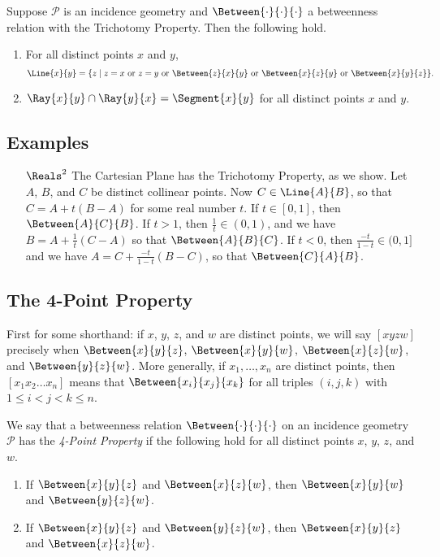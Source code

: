 \documentclass{article}
\begin{document}
\begin{prop}
Suppose $\mathcal{P}$ is an incidence geometry and $\Between{\cdot}{\cdot}{\cdot}$ a betweenness relation with the Trichotomy Property. Then the following hold.
\begin{enumerate}
\item For all distinct points $x$ and $y$, \[ \Line{x}{y} = \{ z \mid z = x\ \mathrm{or}\ z = y\ \mathrm{or}\ \Between{z}{x}{y}\ \mathrm{or}\ \Between{x}{z}{y}\ \mathrm{or}\ \Between{x}{y}{z} \}. \]
\item $\Ray{x}{y} \cap \Ray{y}{x} = \Segment{x}{y}$ for all distinct points $x$ and $y$.
\end{enumerate}
\end{prop}

\subsection*{Examples}

\begin{itemize}
\item[$\Reals^2$] The Cartesian Plane has the Trichotomy Property, as we show. Let $A$, $B$, and $C$ be distinct collinear points. Now $C \in \Line{A}{B}$, so that $C = A + t(B-A)$ for some real number $t$. If $t \in [0,1]$, then $\Between{A}{C}{B}$. If $t > 1$, then $\frac{1}{t} \in (0,1)$, and we have $B = A + \frac{1}{t}(C-A)$ so that $\Between{A}{B}{C}$. If $t < 0$, then $\frac{-t}{1-t} \in (0,1]$ and we have $A = C + \frac{-t}{1-t}(B-C)$, so that $\Between{C}{A}{B}$.
\end{itemize}



\subsection*{The 4-Point Property}

First for some shorthand: if $x$, $y$, $z$, and $w$ are distinct points, we will say $[xyzw]$ precisely when $\Between{x}{y}{z}$, $\Between{x}{y}{w}$, $\Between{x}{z}{w}$, and $\Between{y}{z}{w}$. More generally, if $x_1, \ldots, x_n$ are distinct points, then $[x_1x_2 \ldots x_n]$ means that $\Between{x_i}{x_j}{x_k}$ for all triples $(i,j,k)$ with $1 \leq i < j < k \leq n$.

\begin{dfn}
We say that a betweenness relation $\Between{\cdot}{\cdot}{\cdot}$ on an incidence geometry $\mathcal{P}$ has the \emph{4-Point Property} if the following hold for all distinct points $x$, $y$, $z$, and $w$.
\begin{enumerate}
\item If $\Between{x}{y}{z}$ and $\Between{x}{z}{w}$, then $\Between{x}{y}{w}$ and $\Between{y}{z}{w}$.
\item If $\Between{x}{y}{z}$ and $\Between{y}{z}{w}$, then $\Between{x}{y}{z}$ and $\Between{x}{z}{w}$.
\end{enumerate}
\end{dfn}
\end{document}
